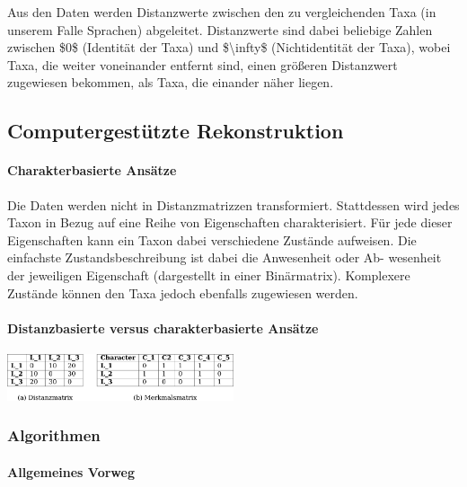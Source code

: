 Aus den Daten werden Distanzwerte zwischen den zu vergleichenden Taxa
(in unserem Falle Sprachen) abgeleitet. Distanzwerte sind dabei
beliebige Zahlen zwischen \$0\$ (Identität der Taxa) und
\$\textbackslash{}infty\$ (Nichtidentität der Taxa), wobei Taxa, die
weiter voneinander entfernt sind, einen größeren Distanzwert zugewiesen
bekommen, als Taxa, die einander näher liegen.

\subsection{Computergestützte Rekonstruktion}


\paragraph{Charakterbasierte Ansätze}

Die Daten werden nicht in Distanzmatrizzen transformiert. Stattdessen
wird jedes Taxon in Bezug auf eine Reihe von Eigenschaften
charakterisiert. Für jede dieser Eigenschaften kann ein Taxon dabei
verschiedene Zustände aufweisen. Die einfachste Zustandsbeschreibung ist
dabei die Anwesenheit oder Ab- wesenheit der jeweiligen Eigenschaft
(dargestellt in einer Binärmatrix). Komplexere Zustände können den Taxa
jedoch ebenfalls zugewiesen werden.




\paragraph{Distanzbasierte versus charakterbasierte Ansätze}

\begin{center}
\includegraphics[width=0.5\textwidth]{img/perspective.png}
\end{center}



\subsubsection{\texorpdfstring{{Algorithmen}}{Algorithmen}}

\paragraph{Allgemeines Vorweg}

